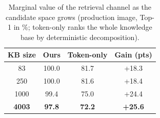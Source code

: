 \begin{table}[t]
\caption{Marginal value of the retrieval channel as the candidate space grows (production image, Top-1 in \%; token-only ranks the whole knowledge base by deterministic decomposition).}
\label{tab:production}
\centering
\footnotesize
\setlength{\tabcolsep}{3.5pt}
\begin{tabular}{cccc}
\toprule
KB size & Ours & Token-only & Gain (pts) \\
\midrule
83 & 100.0 & 81.7 & +18.3 \\
250 & 100.0 & 81.6 & +18.4 \\
1000 & 99.4 & 75.0 & +24.4 \\
\textbf{4003} & \textbf{97.8} & \textbf{72.2} & \textbf{+25.6} \\
\bottomrule
\end{tabular}
\end{table}
